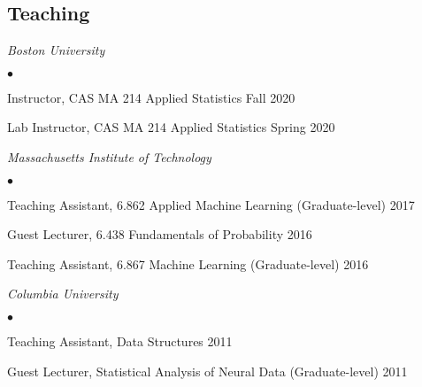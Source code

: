 \documentclass[margin,line]{res}
\newenvironment{list2}{
  \begin{list}{$\bullet$}{%
      \setlength{\itemsep}{0in}
      \setlength{\parsep}{0in} \setlength{\parskip}{0in}
      \setlength{\topsep}{0in} \setlength{\partopsep}{0in}
      \setlength{\leftmargin}{0.2in}}}{\end{list}}
\begin{document}
\begin{resume}
\section{\sc Teaching}

\emph{Boston University}
\begin{list2}
\item Instructor, CAS MA 214 Applied Statistics \hfill Fall 2020
\item Lab Instructor, CAS MA 214 Applied Statistics \hfill Spring 2020
\end{list2}

\emph{Massachusetts Institute of Technology}
\begin{list2}
\item Teaching Assistant, 6.862 Applied Machine Learning (Graduate-level) \hfill 2017
\item Guest Lecturer, 6.438 Fundamentals of Probability \hfill 2016
\item Teaching Assistant, 6.867 Machine Learning (Graduate-level) \hfill 2016
\end{list2}

\emph{Columbia University}
\begin{list2}
\item Teaching Assistant, Data Structures \hfill 2011
\item Guest Lecturer, Statistical Analysis of Neural Data (Graduate-level) \hfill  2011
\end{list2}






\end{resume}
\end{document}
